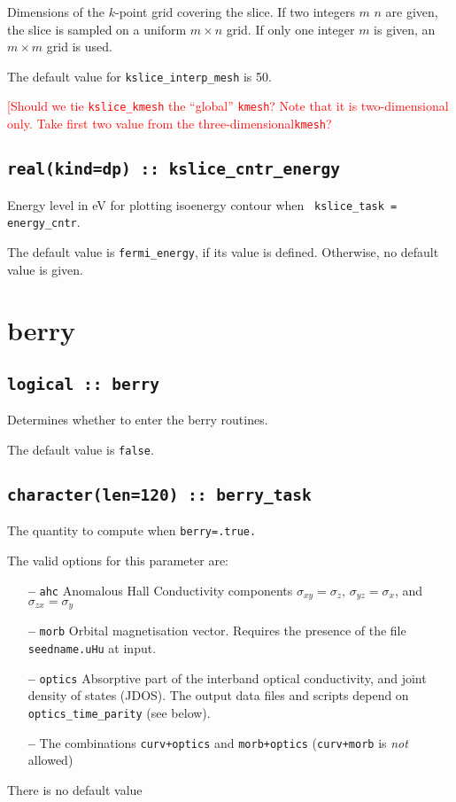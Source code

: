 Dimensions of the $k$-point grid covering the slice.
If two integers $m$ $n$ are given, the slice is sampled on a uniform
$m\times n$ grid.  If only one integer $m$ is given, an $m\times m$
grid is used.

The default value for \verb#kslice_interp_mesh# is 50.

\textcolor{red}{{[Should we tie {\tt kslice\_kmesh} the ``global''
{\tt kmesh}? Note that it is two-dimensional only. Take first
two value from the three-dimensional{\tt kmesh}?}}


\subsection[kslice\_cntr\_energy]{\tt real(kind=dp) :: kslice\_cntr\_energy}

Energy level in eV for plotting isoenergy contour when {\tt
  kslice\_task = energy\_cntr}.

The default value is {\tt fermi\_energy}, if its value is
defined. Otherwise, no default value is given.

\clearpage
\section{berry}

\subsection[berry]{\tt logical :: berry}
Determines whether to enter the berry routines.

The default value is \verb#false#.


\subsection[berry\_task]{\tt character(len=120) ::  berry\_task}
The quantity to compute when {\tt berry=.true.}

The valid options for this parameter are:
\begin{itemize}
\item[{\bf --}] \verb#ahc# Anomalous Hall Conductivity components
  $\sigma_{xy}=\sigma_z$, $\sigma_{yz}=\sigma_x$, and
  $\sigma_{zx}=\sigma_y$
\item[{\bf --}]  \verb#morb# Orbital magnetisation vector. Requires the
presence of the file {\tt seedname.uHu} at input.

\item[{\bf --}] \verb#optics# Absorptive part of the interband optical
  conductivity, and joint density of states (JDOS).  The output data
  files and scripts depend on {\tt optics\_time\_parity} (see below).

\item[{\bf --}] The combinations {\tt curv+optics} and {\tt morb+optics}
({\tt curv+morb} is {\it not} allowed)

\end{itemize}
There is no default value


